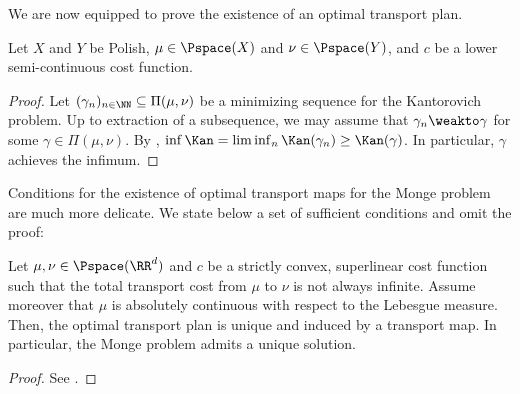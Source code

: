 \documentclass[oneside,reqno,letterpaper]{amsart}
\begin{document}
We are now equipped to prove the existence of an optimal transport plan.
\begin{theorem}[Kantorovich]\label{prop:kan-existence}
  Let \(X\) and \(Y\) be Polish, \(\mu \in \Pspace(X)\) and \(\nu \in \Pspace(Y)\), and \(c\) be a lower semi-continuous cost function.
\end{theorem}
\begin{proof}
  Let \((\gamma_n)_{n \in \NN} \subseteq \Pi(\mu, \nu)\) be a minimizing sequence for the Kantorovich problem.
  Up to extraction of a subsequence, we may assume that \(\gamma_n \weakto \gamma\) for some \(\gamma \in \Pi(\mu, \nu)\).
  By , \(\inf \Kan = \liminf_n \Kan(\gamma_n) \geq \Kan(\gamma)\).
  In particular, \(\gamma\) achieves the infimum.
\end{proof}


Conditions for the existence of optimal transport maps for the Monge problem are much more delicate.
We state below a set of sufficient conditions and omit the proof:
\begin{theorem}\label{prop:mon-existence}
  Let \(\mu, \nu \in \Pspace(\RR^d)\) and \(c\) be a strictly convex, superlinear cost function such that the total transport cost from \(\mu\) to \(\nu\) is not always infinite.
  Assume moreover that \(\mu\) is absolutely continuous with respect to the Lebesgue measure.
  Then, the optimal transport plan is unique and induced by a transport map.
  In particular, the Monge problem admits a unique solution.
\end{theorem}
\begin{proof}
  See \cite[Theorem 2.44]{Villani2003}.
\end{proof}
\end{document}
